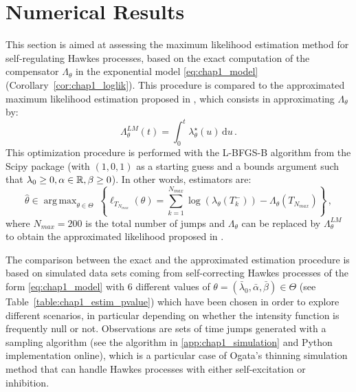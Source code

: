\section{Numerical Results}\label{sec:chap1_num_res}

This section is aimed at assessing the maximum likelihood estimation method for self-regulating Hawkes processes, based on the exact computation of the compensator \(\Lambda_\theta\) in the exponential model \eqref{eq:chap1_model} (Corollary~\ref{cor:chap1_loglik}).
This procedure is compared to the approximated maximum likelihood estimation proposed in \textcite{Lemonnier2014}, which consists in approximating $\Lambda_\theta$ by:
\[
  \Lambda_\theta^{LM}(t) = \int_{0}^{t}{\lambda_\theta^\star(u)\,\mathrm{d}u}\,.
\]
This optimization procedure is performed with the L-BFGS-B algorithm from the Scipy package (with $(1,0,1)$ as a starting guess and a bounds argument such that $\lambda_0 \geq 0, \alpha \in {\mathbb R}, \beta\geq 0$).
In other words, estimators are:
\[
  \hat \theta \in \operatorname{arg\,max}_{\theta \in \Theta} ~
  \left\{ \ell_{T_{N_{max}}}(\theta)
  =
  \sum_{k=1}^{N_{max}}{\log{(\lambda_\theta(T_k^-))}} - \Lambda_\theta(T_{N_{max}}) \right\}\,,
\]
where
\(N_{max}=200\) is the total number of jumps
and \(\Lambda_\theta\) can be replaced by \(\Lambda_\theta^{LM}\) to obtain the approximated likelihood proposed in \textcite{Lemonnier2014}.

The comparison between the exact and the approximated estimation procedure is based on simulated data sets coming from self-correcting Hawkes processes of the form \eqref{eq:chap1_model} with 6 different values of \(\theta = (\bar \lambda_0, \bar \alpha, \bar \beta) \in \Theta\) (see Table~\ref{table:chap1_estim_pvalue}) which have been chosen in order to explore different scenarios, in particular depending on whether the intensity function is frequently null or not.
Observations are sets of time jumps generated with a sampling algorithm (see the algorithm in \ref{app:chap1_simulation} and Python implementation online), which is a particular case of Ogata's thinning simulation method \parencite{Ogata1981} that can handle Hawkes processes with either self-excitation or inhibition.

